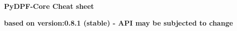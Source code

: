 \documentclass[9pt,landscape]{article}
\begin{document}
\raggedright
\footnotesize


\begin{center}
     \Huge{\textbf{PyDPF-Core Cheat sheet}} \\
\end{center}
\begin{center}
\small{\textbf{based on version:0.8.1 (stable) - API may be subjected to change}} \
\end{center}
\vspace{-0.15cm}
\noindent\makebox[\linewidth]{\rule{\paperwidth}{2pt}}
\end{document}
